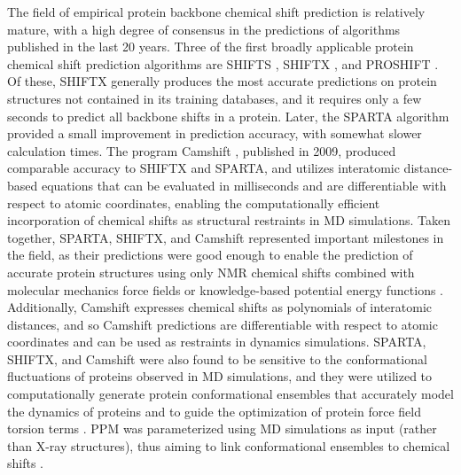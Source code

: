 \documentclass[9pt,review]{livecoms}
\begin{document}
The field of empirical protein backbone chemical shift prediction is relatively mature, with a high degree of consensus in the predictions of algorithms published in the last 20 years.
Three of the first broadly applicable protein chemical shift prediction algorithms are SHIFTS \cite{xu_automated_2001}, SHIFTX \cite{neal_rapid_2003}, and PROSHIFT \cite{meiler_proshift_2003}. Of these, SHIFTX generally produces the most accurate predictions on protein structures not contained in its training databases, and it requires only a few seconds to predict all backbone shifts in a protein.
Later, the SPARTA algorithm \cite{shen_protein_2007} provided a small improvement in prediction accuracy, with somewhat slower calculation times.
The program Camshift \cite{kohlhoff_fast_2009}, published in 2009, produced comparable accuracy to SHIFTX and SPARTA, and utilizes interatomic distance-based equations that can be evaluated in milliseconds and are differentiable with respect to atomic coordinates, enabling the computationally efficient incorporation of chemical shifts as structural restraints in MD simulations.
Taken together, SPARTA, SHIFTX, and Camshift represented important milestones in the field, as their predictions were good enough to enable the prediction of accurate protein structures using only NMR chemical shifts combined with molecular mechanics force fields or knowledge-based potential energy functions \cite{cavalli_protein_2007,shen_consistent_2008,wishart_cs23d_2008,robustelli_folding_2009,robustelli_using_2010}.
Additionally, Camshift expresses chemical shifts as polynomials of interatomic distances, and so Camshift predictions are differentiable with respect to atomic coordinates and can be used as restraints in dynamics simulations.
SPARTA, SHIFTX, and Camshift were also found to be sensitive to the conformational fluctuations of proteins observed in MD simulations, and they were utilized to computationally generate protein conformational ensembles that accurately model the dynamics of proteins \cite{li_certification_2010,markwick_enhanced_2010,robustelli_interpreting_2012,robustelli_conformational_2013} and to guide the optimization of protein force field torsion terms \cite{li_nmr-based_2010,robustelli_developing_2018}.
PPM was parameterized using MD simulations as input (rather than X-ray structures), thus aiming to link conformational ensembles to chemical shifts \cite{li_ppm_2012}.
\end{document}
